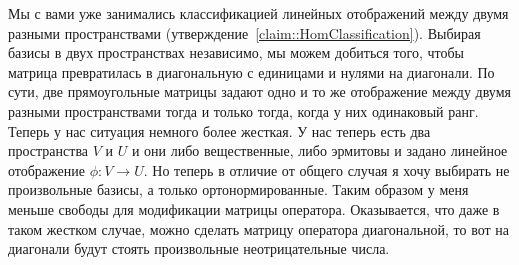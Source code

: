 Мы с вами уже занимались классификацией линейных отображений между двумя разными пространствами (утверждение~\ref{claim::HomClassification}). Выбирая базисы в двух пространствах независимо, мы можем добиться того, чтобы матрица превратилась в диагональную с единицами и нулями на диагонали. По сути, две прямоугольные матрицы задают одно и то же отображение между двумя разными пространствами тогда и только тогда, когда у них одинаковый ранг. Теперь у нас ситуация немного более жесткая. У нас теперь есть два пространства $V$ и $U$ и они либо вещественные, либо эрмитовы и задано линейное отображение $\phi\colon V\to U$. Но теперь в отличие от общего случая я хочу выбирать не произвольные базисы, а только ортонормированные. Таким образом у меня меньше свободы для модификации матрицы оператора. Оказывается, что даже в таком жестком случае, можно сделать матрицу оператора диагональной, то вот на диагонали будут стоять произвольные неотрицательные числа.

